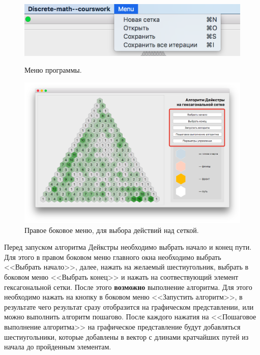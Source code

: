 \begin{figure}[h]
\begin{center}
\begin{minipage}[h]{0.47\linewidth}
\includegraphics[width=1\linewidth]{inc/img/menu}
\caption{Меню программы.} %
\label{axis:cube} %
\end{minipage}
\hfill 
\begin{minipage}[h]{0.47\linewidth}
\includegraphics[width=1\linewidth]{inc/img/doSomeThings}
\caption{Правое боковое меню, для выбора действий над сеткой.}
\label{axis:axial}
\end{minipage}
\end{center}
\end{figure}

Перед запуском алгоритма Дейкстры необходимо выбрать начало и конец пути. Для этого в правом боковом меню главного окна необходимо выбрать <<Выбрать начало>>, далее, нажать на желаемый шестиугольник, выбрать в боковом меню <<Выбрать конец>> и нажать на соотвествующий элемент гексагональной сетки. После этого \textbf{возможно} выполнение алгоритма. Для этого необходимо нажать на кнопку в боковом меню <<Запустить алгоритм>>, в результате чего результат сразу отобразится на графическом представлении, или можно выполнить алгоритм пошагово. После каждого нажатия на <<Пошаговое выполнение алгоритма>> на графическое представление будут добавляться шестиугольники, которые добавлены в вектор с длинами кратчайших путей из начала до пройденным элементам. \par

